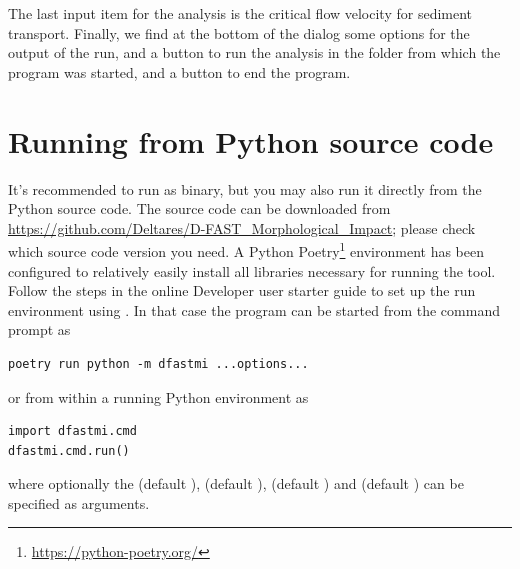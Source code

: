 The last input item for the analysis is the critical flow velocity  for sediment transport.
Finally, we find at the bottom of the dialog some options for the output of the \dfastmi run, and a button to run the analysis in the folder from which the program was started, and a button to end the program.

\section{Running from Python source code}
It's recommended to run \dfastmi as binary, but you may also run it directly from the Python source code.
The source code can be downloaded from \url{https://github.com/Deltares/D-FAST_Morphological_Impact}; please check which source code version you need.
A Python Poetry\footnote{\url{https://python-poetry.org/}} environment has been configured to relatively easily install all libraries necessary for running the tool.
Follow the steps in the online Developer user starter guide to set up the run environment using .
In that case the program can be started from the command prompt as

\begin{Verbatim}
poetry run python -m dfastmi ...options...
\end{Verbatim}

or from within a running Python environment as

\begin{Verbatim}
import dfastmi.cmd
dfastmi.cmd.run()
\end{Verbatim}

where optionally the  (default ),  (default ),  (default ) and  (default ) can be specified as arguments.